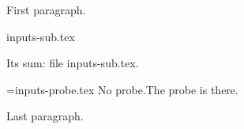 \documentclass{article}
\begin{document}
First paragraph.

\makeatletter
\@@input inputs-sub.tex
\makeatother

Its sum: \pdfmdfivesum file {inputs-sub.tex}.

\immediate\openin\probe=inputs-probe.tex
\ifeof\probe No probe.\else The probe is there.\immediate\closein\probe\fi

Last paragraph.
\end{document}
